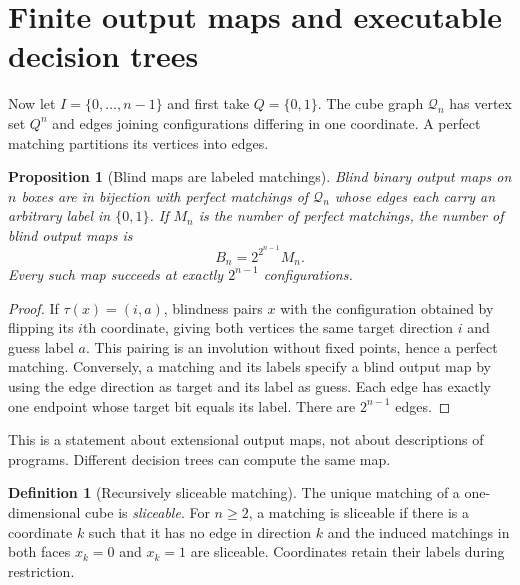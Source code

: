 \documentclass[11pt,letterpaper]{article}
\newtheorem{proposition}[theorem]{Proposition}
\theoremstyle{definition}
\newtheorem{definition}[theorem]{Definition}
\begin{document}
\section{Finite output maps and executable decision trees}
\label{mbg:sec:finite}

Now let $I=\{0,\ldots,n-1\}$ and first take $Q=\{0,1\}$. The cube graph $\mathcal Q_n$ has vertex set $Q^n$ and edges joining configurations differing in one coordinate. A perfect matching partitions its vertices into edges.

\begin{proposition}[Blind maps are labeled matchings]
\label{mbg:prop:matching}
Blind binary output maps on $n$ boxes are in bijection with perfect matchings of $\mathcal Q_n$ whose edges each carry an arbitrary label in $\{0,1\}$. If $M_n$ is the number of perfect matchings, the number of blind output maps is
\[
 B_n=2^{2^{n-1}}M_n.
\]
Every such map succeeds at exactly $2^{n-1}$ configurations.
\end{proposition}
\begin{proof}
If $\tau(x)=(i,a)$, blindness pairs $x$ with the configuration obtained by flipping its $i$th coordinate, giving both vertices the same target direction $i$ and guess label $a$. This pairing is an involution without fixed points, hence a perfect matching. Conversely, a matching and its labels specify a blind output map by using the edge direction as target and its label as guess. Each edge has exactly one endpoint whose target bit equals its label. There are $2^{n-1}$ edges.
\end{proof}

This is a statement about extensional output maps, not about descriptions of programs. Different decision trees can compute the same map.

\begin{definition}[Recursively sliceable matching]
The unique matching of a one-dimensional cube is \emph{sliceable}. For $n\ge2$, a matching is sliceable if there is a coordinate $k$ such that it has no edge in direction $k$ and the induced matchings in both faces $x_k=0$ and $x_k=1$ are sliceable. Coordinates retain their labels during restriction.
\end{definition}
\end{document}
